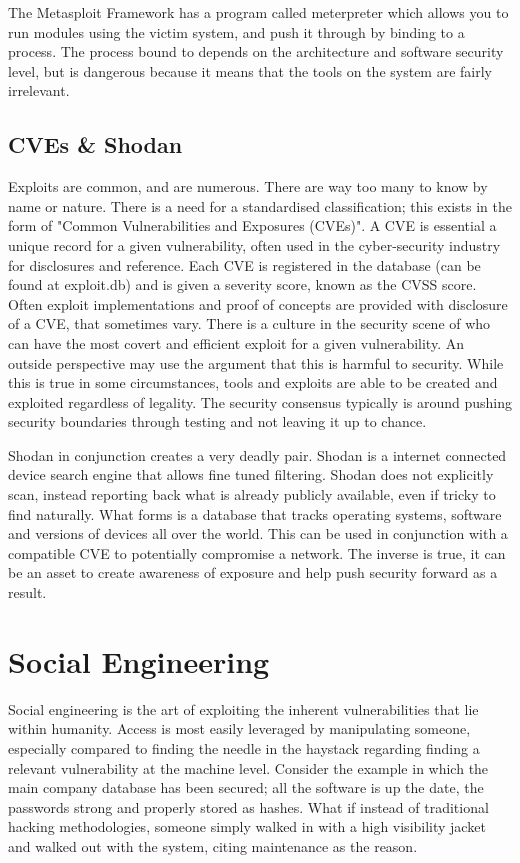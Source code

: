 The Metasploit Framework has a program called meterpreter which allows you to run modules using the victim system, and push it through by binding to a process. The process bound to depends on the architecture and software security level, but is dangerous
because it means that the tools on the system are fairly irrelevant. 

\subsection{CVEs \& Shodan}
Exploits are common, and are numerous. There are way too many to know by name or nature. There is a need for a standardised classification; this exists in the form of "Common Vulnerabilities and Exposures (CVEs)". A CVE is essential a unique record for a given vulnerability,
often used in the cyber-security industry for disclosures and reference. Each CVE is registered in the database (can be found at exploit.db) and is given a severity score, known as the CVSS score. Often exploit implementations and proof of concepts are provided with disclosure of a CVE, that sometimes vary.
There is a culture in the security scene of who can have the most covert and efficient exploit for a given vulnerability. An outside perspective may use the argument that this is harmful to security. While this is true in some circumstances, tools and exploits are able to be created and exploited regardless of legality.
The security consensus typically is around pushing security boundaries through testing and not leaving it up to chance. 


Shodan in conjunction creates a very deadly pair. Shodan is a internet connected device search engine that allows fine tuned filtering.
Shodan does not explicitly scan, instead reporting back what is already publicly available, even if tricky to find naturally. What forms is a database that 
tracks operating systems, software and versions of devices all over the world. This can be used in conjunction with a compatible CVE to potentially compromise a network.
The inverse is true, it can be an asset to create awareness of exposure and help push security forward as a result.


\section{Social Engineering}
Social engineering is the art of exploiting the inherent vulnerabilities that lie within humanity. Access is most easily leveraged by manipulating someone, especially compared to finding the needle in the haystack regarding finding a relevant vulnerability at the machine level. 
Consider the example in which the main company database has been secured; all the software is up the date, the passwords strong and properly stored as hashes. What if instead of traditional hacking methodologies, someone simply walked in with a high visibility jacket and walked out with the system, 
citing maintenance as the reason. \citep{AssignmentSecurityForensicsPaper}


